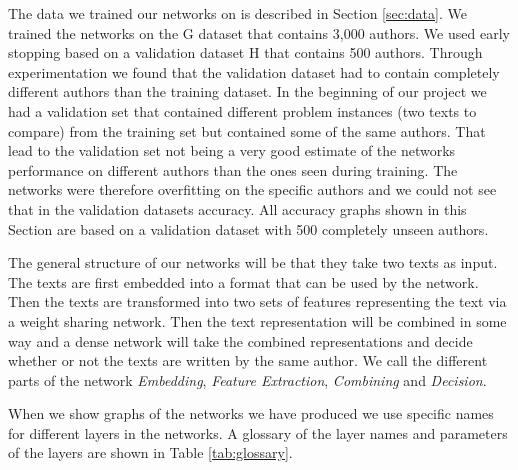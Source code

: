 The data we trained our networks on is described in Section \ref{sec:data}. We
trained the networks on the \gls{G} dataset that contains 3,000 authors. We used
early stopping based on a validation dataset \gls{H} that contains 500 authors.
Through experimentation we found that the validation dataset had to contain
completely different authors than the training dataset. In the beginning of
our project we had a validation set that contained different problem instances
(two texts to compare) from the training set but contained some of the same
authors. That lead to the validation set not being a very good estimate of the
networks performance on different authors than the ones seen during training.
The networks were therefore overfitting on the specific authors and we could not
see that in the validation datasets accuracy. All accuracy graphs shown in this
Section are based on a validation dataset with 500 completely unseen authors.

The general structure of our networks will be that they take two texts as input.
The texts are first embedded into a format that can be used by the network.
Then the texts are transformed into two sets of features representing the text
via a weight sharing network. Then the text representation will be combined
in some way and a dense network will take the combined representations and
decide whether or not the texts are written by the same author. We call the
different parts of the network \textit{Embedding}, \textit{Feature Extraction},
\textit{Combining} and \textit{Decision}.

When we show graphs of the networks we have produced we use specific names for
different layers in the networks. A glossary of the layer names and parameters
of the layers are shown in Table \ref{tab:glossary}.

